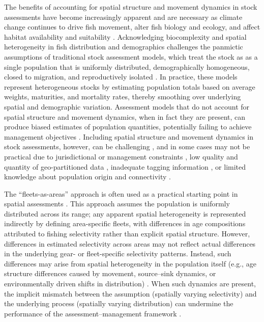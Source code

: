 \documentclass[
  12pt,
]{article}
\begin{document}
The benefits of accounting for spatial structure and movement dynamics
in stock assessments have become increasingly apparent
\citep{Goethel2021, Bosley2022, Goethel2023, Berger2024} and are
necessary as climate change continues to drive fish movement, alter fish
biology and ecology, and affect habitat availability and suitability
\citep{Portner2010, Ciannelli2013}. Acknowledging biocomplexity and
spatial heterogeneity in fish distribution and demographics challenges
the panmictic assumptions of traditional stock assessment models, which
treat the stock as as a single population that is uniformly distributed,
demographically homogeneous, closed to migration, and reproductively
isolated \citep{Beverton1957, Cadrin2020}. In practice, these models
represent heterogeneous stocks by estimating population totals based on
average weights, maturities, and mortality rates, thereby smoothing over
underlying spatial and demographic variation. Assessment models that do
not account for spatial structure and movement dynamics, when in fact
they are present, can produce biased estimates of population quantities,
potentially failing to achieve management objectives
\citep{Bosley2019, Goethel2023}. Including spatial structure and
movement dynamics in stock assessments, however, can be challenging
\citep{Punt2019, Punt2020, Goethel2022, Berger2021, Berger2024}, and in
some cases may not be practical due to jurisdictional or management
constraints \citep{Kerr2017}, low quality and quantity of
geo-partitioned data \citep{Cadrin2020, Punt2020}, inadequate tagging
information \citep{Goethel2011, Goethel2019}, or limited knowledge about
population origin and connectivity \citep{Berger2017}.

The ``fleets-as-areas'' approach is often used as a practical starting
point in spatial assessments
\citep{Berger2012, Waterhouse2014, Lee2017, Bosley2022}. This approach
assumes the population is uniformly distributed across its range; any
apparent spatial heterogeneity is represented indirectly by defining
area-specific fleets, with differences in age compositions attributed to
fishing selectivity rather than explicit spatial structure. However,
differences in estimated selectivity across areas may not reflect actual
differences in the underlying gear- or fleet-specific selectivity
patterns. Instead, such differences may arise from spatial heterogeneity
in the population itself (e.g., age structure differences caused by
movement, source--sink dynamics, or environmentally driven shifts in
distribution) \citep{Cope2011, Berger2012, Hurtado2014, O'Boyle2016}.
When such dynamics are present, the implicit mismatch between the
assumption (spatially varying selectivity) and the underlying process
(spatially varying distribution) can undermine the performance of the
assessment--management framework \citep{Punt2016, Punt2017}.
\end{document}
